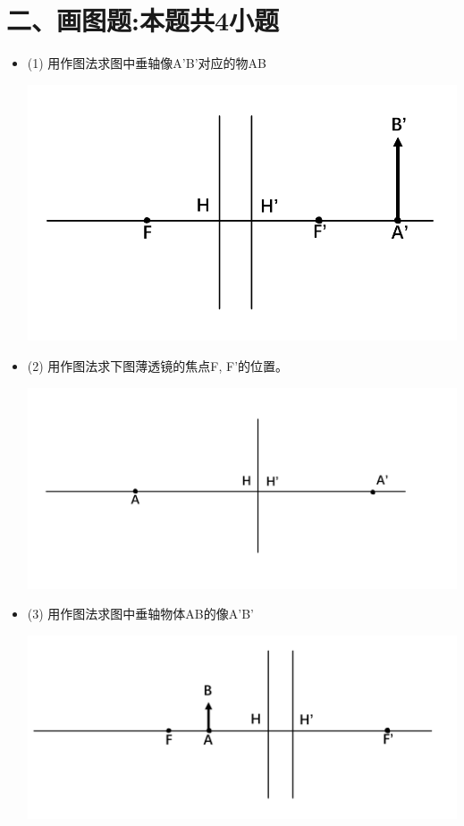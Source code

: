 \documentclass[11pt,a4paper]{article}
\begin{document}
    \section*{二、画图题:本题共4小题}
    \begin{itemize}
        \item (1) 用作图法求图中垂轴像A'B'对应的物AB
        
        \includegraphics[scale=0.2]{1.png}%
        \vspace{-5mm}
        \item (2) 用作图法求下图薄透镜的焦点F, F'的位置。
         
        \includegraphics[scale=0.2]{2.png}%
        \vspace{-5mm}
        \item (3) 用作图法求图中垂轴物体AB的像A'B'
        
        \includegraphics[scale=0.2]{3.png}%
    \end{itemize}
\end{document}
